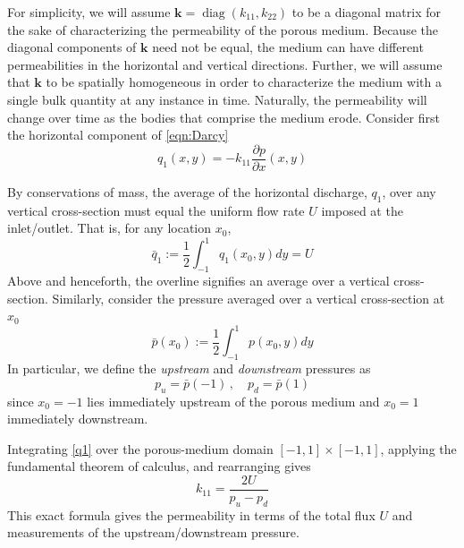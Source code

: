\documentclass[3p]{elsarticle}
\newcommand{\pderiv}[2]{\frac{\partial #1}{\partial #2}}
\newcommand{\bvec}[1]{\mathbf{#1}}
\newcommand {\bq} {\bvec{q}}
\newcommand{\qavg}{\bar{q}}
\newcommand{\pavg}{\bar{p}}
\newcommand{\pup}{p_u}
\newcommand{\pdn}{p_d}
\newcommand{\diag}{\mathop{\mathrm{diag}}}
\begin{document}
For simplicity, we will assume $\bvec{k}  = \diag(k_{11}, k_{22})$ to be a diagonal matrix for the sake of characterizing the permeability of the porous medium. Because the diagonal components of $\bvec{k}$ need not be equal, the medium can have different permeabilities in the horizontal and vertical directions. Further, we will assume that $\bvec{k}$ to be spatially homogeneous in order to characterize the medium with a single bulk quantity at any instance in time. Naturally, the permeability will change over time as the bodies that comprise the medium erode. Consider first the horizontal component of \eqref{eqn:Darcy}
\begin{equation}
\label{q1}
q_1(x,y) = -k_{11} \pderiv{p}{x}(x,y)
\end{equation}

By conservations of mass, the average of the horizontal discharge, $q_1$, over any vertical cross-section must equal the uniform flow rate $U$ imposed at the inlet/outlet. That is, for any location $x_0$,
\begin{equation}
\qavg_1 := \frac{1}{2} \int_{-1}^{1} q_1(x_0, y) dy = U
\end{equation}
Above and henceforth, the overline signifies an average over a vertical cross-section. Similarly, consider the pressure averaged over a vertical cross-section at $x_0$
\begin{equation}
\pavg(x_0) := \frac{1}{2} \int_{-1}^{1} p(x_0, y) dy
\end{equation}
In particular, we define the {\em upstream} and {\em downstream} pressures as
\begin{equation}
\pup = \pavg(-1) \, , \quad \pdn = \pavg(1)
\end{equation}
since $x_0 = -1$ lies immediately upstream of the porous medium and $x_0 = 1$ immediately downstream.

Integrating \eqref{q1} over the porous-medium domain $[-1, 1] \times [-1,1]$, applying the fundamental theorem of calculus, and rearranging gives
\begin{equation}
\label{eqn:k11}
k_{11} = \frac{2U}{\pup - \pdn}
\end{equation}
This exact formula gives the permeability in terms of the total flux $U$ and measurements of the upstream/downstream pressure.

 
\end{document}
